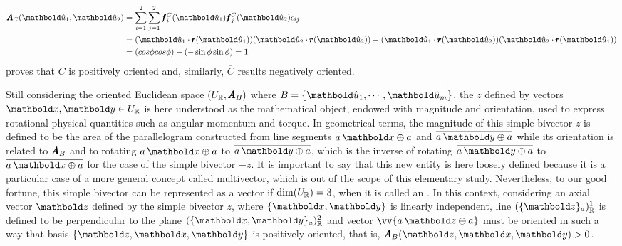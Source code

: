 \begin{align*}
\fua{\tnr{A}_{C}}{\vun{u}_1,\vun{u}_2}&=\sum_{i=1}^2\sum_{j=1}^2\fua{\vtf{f}^\con{C}_{i}}{\vun{u}_1}\fua{\vtf{f}^\con{C}_{j}}{\vun{u}_2}\epsilon_{ij}\\
&=(\vun{u}_1\cdot\fua{\vtf{r}}{\vun{u}_1})(\vun{u}_2\cdot\fua{\vtf{r}}{\vun{u}_2})-(\vun{u}_1\cdot\fua{\vtf{r}}{\vun{u}_2})(\vun{u}_2\cdot\fua{\vtf{r}}{\vun{u}_1})\\
&=(cos\phi cos\phi) - (-\sin\phi\sin\phi)=1
\end{align*}
proves that $C$ is positively oriented and, similarly, $\overline{C}$ results negatively oriented.


Still considering  the oriented Euclidean space $(U_{\mathbb{R}},\pmb{A}_B)$ where $B=\{\vun{u}_1,\cdots,\vun{u}_m\}$, the  $z$ defined by vectors $\vto{x},\vto{y}\in U_\real$ is here understood as the mathematical object, endowed with magnitude and orientation, used to express rotational physical quantities such as angular momentum and torque. In geometrical terms, the magnitude of this simple bivector $z$ is defined to be the area of the parallelogram constructed from line segments $\overline{a\,\vto{x}\oplus a}$ and $\overline{a\,\vto{y}\oplus a}$ while its orientation is related to $\pmb{A}_B$ and to rotating $\overline{a\,\vto{x}\oplus a}$ to $\overline{a\,\vto{y}\oplus a}$, which is the inverse of rotating $\overline{a\,\vto{y}\oplus a}$ to $\overline{a\,\vto{x}\oplus a}$ for the case of the simple bivector $-z$. It is important to say that this new entity is here loosely defined because it is a particular case of a more general concept called multivector, which is out of the scope of this elementary study. Nevertheless, to our good fortune, this simple bivector can be represented as a vector if $\dim(U_{\mathbb{R}})=3$, when it is called an . In this context, considering an axial vector $\vto{z}$ defined by the simple bivector $z$, where $\{\vto{x},\vto{y}\}$ is linearly independent, line $(\{\vto{z}\}_a)_\real^1$ is defined to be perpendicular to the plane $(\{\vto{x},\vto{y}\}_a)_\real^2$ and vector $\vv{a\,\vto{z}\oplus a}$ must be oriented in such a way that basis $\{\vto{z},\vto{x},\vto{y}\}$ is positively oriented, that is, $\fua{\tnr{A}_B}{\vto{z},\vto{x},\vto{y}}>0$.
\begin{figure}[!ht]
\centering
\begin{center}
\scalebox{.72}{}
\end{center}
\label{fg:axial}
\end{figure}
